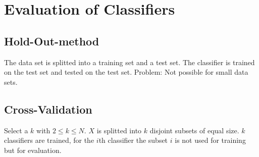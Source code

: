 \chapter{Evaluation of Classifiers}
\section{Hold-Out-method}
The data set is splitted into a training set and a test set. The classifier is trained on the test set and tested on the test set. Problem: Not possible for small data sets.

\section{Cross-Validation}
Select a $k$ with $2 \leq k \leq N$. $X$ is splitted into $k$ disjoint subsets of equal size. $k$ classifiers are trained, for the $i$th classifier the subset $i$ is not used for training but for evaluation.
